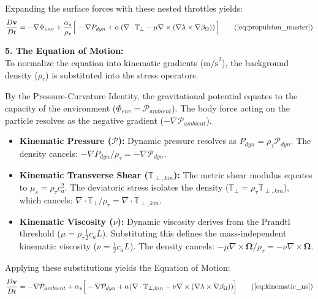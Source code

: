 Expanding the surface forces with these nested throttles yields: %
\begin{equation}
    \frac{D\mathbf{v}}{Dt} = -\nabla \Phi_{env} + \frac{\alpha_s}{\rho_\tau} \Big[ -\nabla P_{dyn} + \alpha \left( \nabla \cdot \mathbb{T}_{\perp} - \mu \nabla \times (\nabla\lambda \times \nabla\beta_\Omega) \right) \Big] \tag{\ref{eq:propulsion_master}} 
\end{equation}

\textbf{5. The Equation of Motion:} \\ 
To normalize the equation into kinematic gradients ($\text{m/s}^2$), the background density ($\rho_\tau$) is substituted into the stress operators. 

By the Pressure-Curvature Identity, the gravitational potential equates to the capacity of the environment ($\Phi_{env} = \mathcal{P}_{ambient}$). The body force acting on the particle resolves as the negative gradient ($-\nabla \mathcal{P}_{ambient}$). %

\begin{itemize}[leftmargin=*]
    \item \textbf{Kinematic Pressure ($\mathcal{P}$):} Dynamic pressure resolves as $P_{dyn} = \rho_\tau \mathcal{P}_{dyn}$. The density cancels: $-\nabla P_{dyn} / \rho_\tau = -\nabla \mathcal{P}_{dyn}$. %
    \item \textbf{Kinematic Transverse Shear ($\mathbb{T}_{\perp, kin}$):} The metric shear modulus equates to $\mu_s = \rho_\tau c_a^2$. The deviatoric stress isolates the density ($\mathbb{T}_{\perp} = \rho_\tau \mathbb{T}_{\perp, kin}$), which cancels: $\nabla \cdot \mathbb{T}_{\perp} / \rho_\tau = \nabla \cdot \mathbb{T}_{\perp, kin}$. %
    \item \textbf{Kinematic Viscosity ($\nu$):} Dynamic viscosity derives from the Prandtl threshold ($\mu = \rho_\tau \frac{1}{2}c_a L$). Substituting this defines the mass-independent kinematic viscosity ($\nu = \frac{1}{2}c_a L$). The density cancels: $-\mu \nabla \times \boldsymbol{\Omega} / \rho_\tau = -\nu \nabla \times \boldsymbol{\Omega}$. %
\end{itemize}

Applying these substitutions yields the Equation of Motion: 
\begin{equation}
    \frac{D\mathbf{v}}{Dt} = -\nabla \mathcal{P}_{ambient} + \alpha_s \Big[ -\nabla \mathcal{P}_{dyn} + \alpha(\nabla \cdot \mathbb{T}_{\perp, kin} - \nu \nabla \times (\nabla\lambda \times \nabla\beta_\Omega)) \Big] \tag{\ref{eq:kinematic_ns}}
\end{equation}

